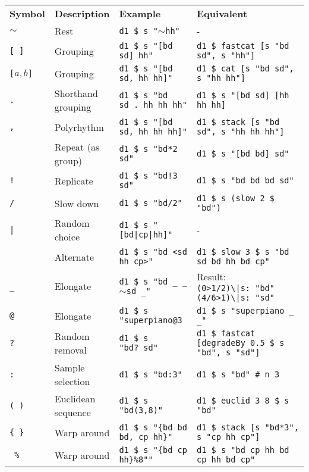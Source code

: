 \documentclass[8pt]{extarticle} %
\newcommand{\rest}{$\sim$}
\begin{document}
\begin{multicols}{2}
		{\small
		\begin{tabular}{L{0.1\linewidth} L{0.2\linewidth} L{0.27\linewidth} L{0.43\linewidth}}
			\small\bf Symbol & \small\bf Description & \small\bf Example & \small\bf Equivalent  \\ 
			\tt \rest   & Rest  & \tt d1 \$ s "\rest hh" & -	\\
			\tt [ ]   & Grouping & \tt d1 \$ s "[bd sd] hh" & \tt d1 \$ fastcat [s "bd sd", s "hh"] \\
			\tt [$a, b$]  & Grouping & \tt d1 \$ s "[bd sd, hh hh]" & \tt d1 \$ cat [s "bd sd", s "hh hh"] \\
			\tt . & Shorthand grouping & \tt d1 \$ s "bd sd\,.\,hh hh hh" & \tt d1 \$ s "[bd sd] [hh hh hh] \\
			\tt , & Polyrhythm  & \tt d1 \$ s "[bd sd, hh hh hh]" & \tt d1 \$ stack [s "bd sd", s "hh hh hh"] \\
			\tt * & Repeat (as group) & \tt d1 \$ s "bd*2 sd" & \tt d1 \$ s "[bd bd] sd" \\
			\tt ! & Replicate & \tt d1 \$ s "bd!3 sd" & \tt d1 \$ s "bd bd bd sd" \\
			\tt / & Slow down & \tt d1 \$ s "bd/2" & \tt d1 \$ s (slow 2 \$ "bd") \\
			\tt | & Random choice & \tt d1 \$ s "[bd|cp|hh]" & - \\
			\tt < > & Alternate & \tt d1 \$ s "bd <sd hh cp>" & \tt d1 \$ slow 3 \$ s "bd sd bd hh bd cp" \\
			\tt \_ & Elongate & \tt d1 \$ s "bd \_ \_ \rest sd \_" & Result: \tt (0>1/2)\textbackslash |s:\,"bd" (4/6>1)\textbackslash |s:\,"sd" \\
			\tt @ & Elongate & \tt d1 \$ s "superpiano@3 & \tt d1 \$ s "superpiano \_ \_" \\
			\tt ? & Random removal & \tt d1 \$ s "bd?\ sd" & \tt d1 \$ fastcat [degradeBy 0.5 \$ s "bd", s "sd"] \\
			\tt : & Sample selection & \tt d1 \$ s "bd:3" & \tt d1 \$ s "bd" \# n 3 \\
			\tt ( ) & Euclidean sequence & \tt d1 \$ s "bd(3,8)" & \tt d1 \$ euclid 3 8 \$ s "bd" \\
			\tt \{ \} & Warp around & \tt d1 \$ s "\{bd bd bd, cp hh\}"& \tt d1 \$ stack [s "bd*3", s "cp hh cp"] \\
			\tt { }\% & Warp around & \tt d1 \$ s "\{bd cp hh\}\%8""& \tt d1 \$ s "bd cp hh bd cp hh bd cp"
	\end{tabular}
	}
		

\end{multicols}
\end{document}

